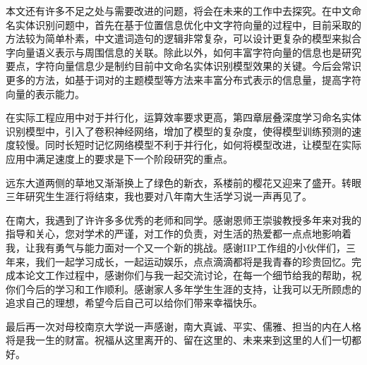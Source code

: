 \documentclass[winfonts,master,oneside,nobackinfo]{njuthesis}
\begin{document}
本文还有许多不足之处与需要改进的问题，将会在未来的工作中去探究。在中文命名实体识别问题中，首先在基于位置信息优化中文字符向量的过程中，目前采取的方法较为简单朴素，中文遣词造句的逻辑非常复杂，可以设计更复杂的模型来拟合字向量语义表示与周围信息的关联。除此以外，如何丰富字符向量的信息也是研究要点，字符向量信息少是制约目前中文命名实体识别模型效果的关键。今后会常识更多的方法，如基于词对的主题模型等方法来丰富分布式表示的信息量，提高字符向量的表示能力。

在实际工程应用中对于并行化，运算效率要求更高，第四章层叠深度学习命名实体识别模型中，引入了卷积神经网络，增加了模型的复杂度，使得模型训练预测的速度较慢。同时长短时记忆网络模型不利于并行化，如何将模型改进，让模型在实际应用中满足速度上的要求是下一个阶段研究的重点。




\begin{acknowledgement}

远东大道两侧的草地又渐渐换上了绿色的新衣，系楼前的樱花又迎来了盛开。转眼三年研究生生涯行将结束，我也要对八年南大生活学习说一声再见了。

在南大，我遇到了许许多多优秀的老师和同学。感谢恩师王崇骏教授多年来对我的指导和关心，您对学术的严谨，对工作的负责，对生活的热爱都一点点地影响着我，让我有勇气与能力面对一个又一个新的挑战。感谢IIP工作组的小伙伴们，三年来，我们一起学习成长，一起运动娱乐，点点滴滴都将是我青春的珍贵回忆。完成本论文工作过程中，感谢你们与我一起交流讨论，在每一个细节给我的帮助，祝你们今后的学习和工作顺利。感谢家人多年学生生涯的支持，让我可以无所顾虑的追求自己的理想，希望今后自己可以给你们带来幸福快乐。

最后再一次对母校南京大学说一声感谢，南大真诚、平实、儒雅、担当的内在人格将是我一生的财富。祝福从这里离开的、留在这里的、未来来到这里的人们一切都好。

\end{acknowledgement}






\end{document}
